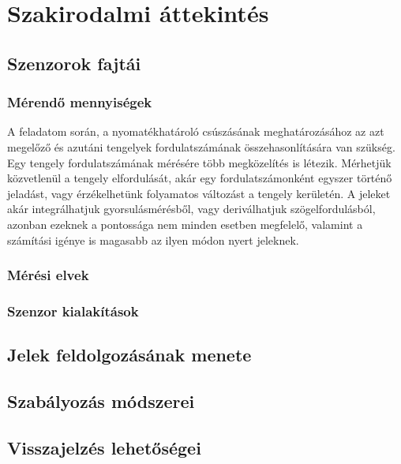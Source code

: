 \chapter{Szakirodalmi áttekintés}
\label{sec:Szakirodalom}
\section{Szenzorok fajtái}

\subsection{Mérendő mennyiségek}

A feladatom során, a nyomatékhatároló csúszásának meghatározásához az azt megelőző és azutáni tengelyek fordulatszámának összehasonlítására van szükség. Egy tengely fordulatszámának mérésére több megközelítés is létezik. Mérhetjük közvetlenül a tengely elfordulását, akár egy fordulatszámonként egyszer történő jeladást, vagy érzékelhetünk folyamatos változást a tengely kerületén. A jeleket akár integrálhatjuk gyorsulásmérésből, vagy deriválhatjuk szögelfordulásból, azonban ezeknek a pontossága nem minden esetben megfelelő, valamint a számítási igénye is magasabb az ilyen módon nyert jeleknek.

\subsection{Mérési elvek}

\subsection{Szenzor kialakítások}
\section{Jelek feldolgozásának menete}

\section{Szabályozás módszerei}

\section{Visszajelzés lehetőségei}
